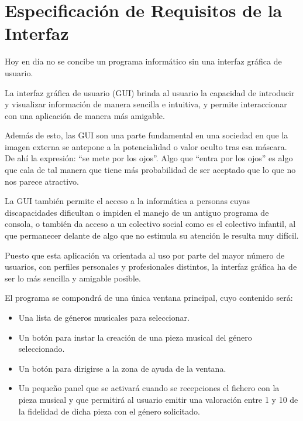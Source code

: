 
\chapter{Especificación de Requisitos de la Interfaz}

Hoy en día no se concibe un programa informático sin una interfaz gráfica de usuario.

La interfaz gráfica de usuario (GUI) brinda al usuario la capacidad de introducir y visualizar información de manera sencilla e intuitiva, y permite interaccionar con una aplicación de manera más amigable.

Además de esto, las GUI son una parte fundamental en una sociedad en que la imagen externa se antepone a la potencialidad o valor oculto tras esa máscara. De ahí la expresión: ``se mete por los ojos''. Algo que ``entra por los ojos'' es algo que cala de tal manera que tiene más probabilidad de ser aceptado que lo que no nos parece atractivo.

La GUI también permite el acceso a la informática a personas cuyas discapacidades dificultan o impiden el manejo de un antiguo programa de consola, o también da acceso a un colectivo social como es el colectivo infantil, al que permanecer delante de algo que no estimula su atención le resulta muy difícil.

Puesto que esta aplicación va orientada al uso por parte del mayor número de usuarios, con perfiles personales y profesionales distintos, la interfaz gráfica ha de ser lo más sencilla y amigable posible.

El programa se compondrá de una única ventana principal, cuyo contenido será:

\begin{itemize}
    \item Una lista de géneros musicales para seleccionar.
    \item Un botón para instar la creación de una pieza musical del género seleccionado.
    \item Un botón para dirigirse a la zona de ayuda de la ventana.
    \item Un pequeño panel que se activará cuando se recepciones el fichero con la pieza musical y que permitirá al usuario emitir una valoración entre 1 y 10 de la fidelidad de dicha pieza con el género solicitado.
\end{itemize}